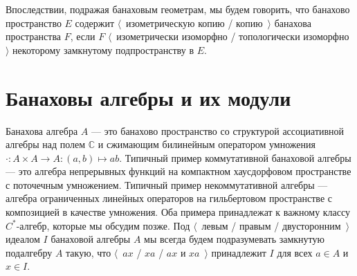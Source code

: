 Впоследствии, подражая банаховым геометрам, мы будем говорить, что банахово
пространство $E$ содержит $\langle$~изометрическую копию / копию~$\rangle$
банахова пространства $F$, если $F$ $\langle$~изометрически изоморфно /
топологически изоморфно~$\rangle$ некоторому замкнутому подпространству в $E$.


\section{Банаховы алгебры и их
    модули}\label{SectionBanachAlgebrasAndTheirModules}

Банахова алгебра $A$ --- это банахово пространство со структурой ассоциативной
алгебры над полем $\mathbb{C}$ и сжимающим билинейным оператором умножения
$\cdot:A\times A\to A:(a,b)\mapsto ab$. Типичный пример коммутативной банаховой
алгебры --- это алгебра непрерывных функций на компактном хаусдорфовом
пространстве с поточечным умножением. Типичный пример некоммутативной алгебры
--- алгебра ограниченных линейных операторов на гильбертовом пространстве с
композицией в качестве умножения. Оба примера принадлежат к важному классу
$C^*$-алгебр, которые мы обсудим позже. Под $\langle$~левым / правым /
двусторонним~$\rangle$ идеалом $I$ банаховой алгебры $A$ мы всегда будем
подразумевать замкнутую подалгебру $A$ такую, что $\langle$~$ax$ / $xa$ / $ax$ и
$xa$~$\rangle$ принадлежит $I$ для всех $a\in A$ и $x\in I$.


